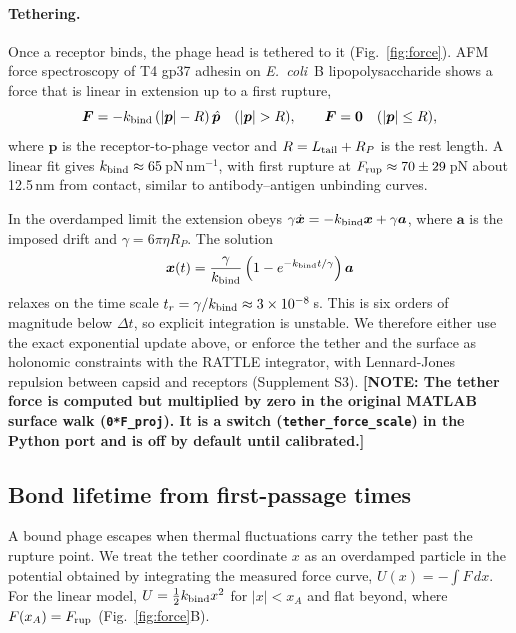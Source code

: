 \documentclass[12pt]{article}
\newcommand{\note}[1]{{\color{red}\textbf{[NOTE: #1]}}}
\begin{document}
\paragraph{Tethering.} Once a receptor binds, the phage head is tethered to it (Fig.~\ref{fig:force}). AFM force spectroscopy of T4 gp37 adhesin on \textit{E.~coli}~B lipopolysaccharide\cite{brzozowska2019} shows a force that is linear in extension up to a first rupture,
\begin{equation}
\bm F=-k_{\rm bind}\,(|\bm p|-R)\,\hat{\bm p}\quad (|\bm p|>R),\qquad \bm F=\bm 0\quad(|\bm p|\le R),
\end{equation}
where $\bm p$ is the receptor-to-phage vector and $R=L_{\rm tail}+R_P$ is the rest length. A linear fit gives $k_{\rm bind}\approx65$\,pN\,nm$^{-1}$, with first rupture at $F_{\rm rup}\approx70\pm29$\,pN about 12.5\,nm from contact\cite{brzozowska2019}, similar to antibody--antigen unbinding curves\cite{hinterdorfer1996detection}.

In the overdamped limit the extension obeys $\gamma\dot{\bm x}=-k_{\rm bind}\bm x+\gamma\bm a$, where $\bm a$ is the imposed drift and $\gamma=6\pi\eta R_P$. The solution
\begin{equation}
\bm x(t)=\frac{\gamma}{k_{\rm bind}}\left(1-e^{-k_{\rm bind}t/\gamma}\right)\bm a
\end{equation}
relaxes on the time scale $t_r=\gamma/k_{\rm bind}\approx3\times10^{-8}$\,s. This is six orders of magnitude below $\Delta t$, so explicit integration is unstable. We therefore either use the exact exponential update above, or enforce the tether and the surface as holonomic constraints with the RATTLE integrator\cite{andersen1983rattle}, with Lennard-Jones repulsion between capsid and receptors (Supplement S3). \note{The tether force is computed but multiplied by zero in the original MATLAB surface walk (\texttt{0*F\_proj}). It is a switch (\texttt{tether\_force\_scale}) in the Python port and is off by default until calibrated.}

\subsection*{Bond lifetime from first-passage times}
A bound phage escapes when thermal fluctuations carry the tether past the rupture point. We treat the tether coordinate $x$ as an overdamped particle in the potential obtained by integrating the measured force curve, $U(x)=-\int F\,dx$. For the linear model, $U=\tfrac12k_{\rm bind}x^2$ for $|x|<x_A$ and flat beyond, where $F(x_A)=F_{\rm rup}$ (Fig.~\ref{fig:force}B).
\end{document}
